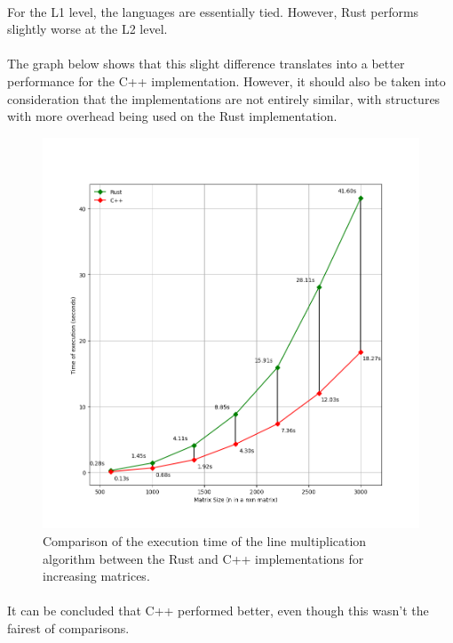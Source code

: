 \documentclass{report}
\begin{document}
			\paragraph{}For the L1 level, the languages are essentially tied. However, Rust performs slightly worse at the L2 level.
			
			\paragraph{}The graph below shows that this slight difference translates into a better performance for the C++ implementation. However, it should also be taken into consideration that the implementations are not entirely similar, with structures with more overhead being used on the Rust implementation.
			
			\begin{figure}[H]
				\begin{adjustbox}{center}
					\includegraphics[scale=0.5]{line_algorithm_comparison.png}
				\end{adjustbox}
				\caption{Comparison of the execution time of the line multiplication algorithm between the Rust and C++ implementations for increasing matrices.}
			\end{figure}
		
			\paragraph{}It can be concluded that C++ performed better, even though this wasn't the fairest of comparisons.
	
\end{document}
